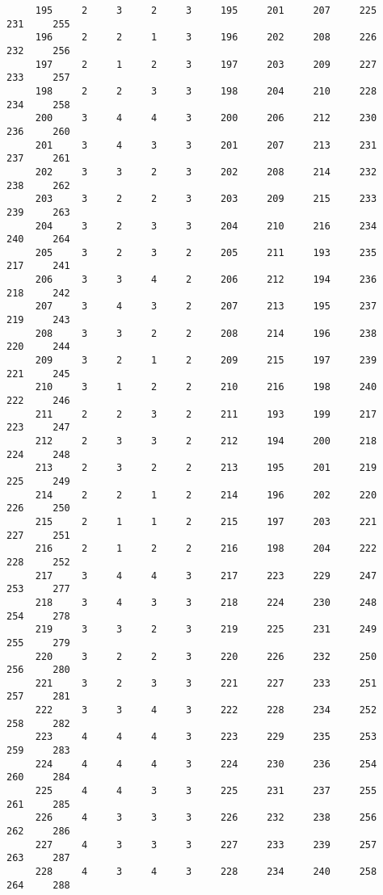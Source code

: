 \begin{verbatim}
     195     2     3     2     3     195     201     207     225     231     255
     196     2     2     1     3     196     202     208     226     232     256
     197     2     1     2     3     197     203     209     227     233     257
     198     2     2     3     3     198     204     210     228     234     258
     200     3     4     4     3     200     206     212     230     236     260
     201     3     4     3     3     201     207     213     231     237     261
     202     3     3     2     3     202     208     214     232     238     262
     203     3     2     2     3     203     209     215     233     239     263
     204     3     2     3     3     204     210     216     234     240     264
     205     3     2     3     2     205     211     193     235     217     241
     206     3     3     4     2     206     212     194     236     218     242
     207     3     4     3     2     207     213     195     237     219     243
     208     3     3     2     2     208     214     196     238     220     244
     209     3     2     1     2     209     215     197     239     221     245
     210     3     1     2     2     210     216     198     240     222     246
     211     2     2     3     2     211     193     199     217     223     247
     212     2     3     3     2     212     194     200     218     224     248
     213     2     3     2     2     213     195     201     219     225     249
     214     2     2     1     2     214     196     202     220     226     250
     215     2     1     1     2     215     197     203     221     227     251
     216     2     1     2     2     216     198     204     222     228     252
     217     3     4     4     3     217     223     229     247     253     277
     218     3     4     3     3     218     224     230     248     254     278
     219     3     3     2     3     219     225     231     249     255     279
     220     3     2     2     3     220     226     232     250     256     280
     221     3     2     3     3     221     227     233     251     257     281
     222     3     3     4     3     222     228     234     252     258     282
     223     4     4     4     3     223     229     235     253     259     283
     224     4     4     4     3     224     230     236     254     260     284
     225     4     4     3     3     225     231     237     255     261     285
     226     4     3     3     3     226     232     238     256     262     286
     227     4     3     3     3     227     233     239     257     263     287
     228     4     3     4     3     228     234     240     258     264     288

\end{verbatim}
